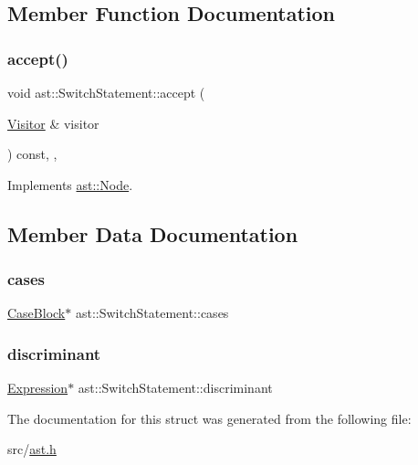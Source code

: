 \subsection{Member Function Documentation}
\mbox{\label{structast_1_1_switch_statement_a1f570a3ec718c95348cedbddcf8e96a1}} 
\subsubsection{\texorpdfstring{accept()}{accept()}}
{\footnotesize\ttfamily void ast\+::\+Switch\+Statement\+::accept (\begin{DoxyParamCaption}\item[{\hyperlink{structast_1_1_visitor}{Visitor} \&}]{visitor }\end{DoxyParamCaption}) const\hspace{0.3cm}{\ttfamily [inline]}, {\ttfamily [override]}, {\ttfamily [virtual]}}



Implements \hyperlink{structast_1_1_node_abc089ee6caaf06a4445ebdd8391fdebc}{ast\+::\+Node}.



\subsection{Member Data Documentation}
\mbox{\label{structast_1_1_switch_statement_ab03ba54ce22b34b83dcd3478ba0a6eb4}} 
\subsubsection{\texorpdfstring{cases}{cases}}
{\footnotesize\ttfamily \hyperlink{structast_1_1_case_block}{Case\+Block}$\ast$ ast\+::\+Switch\+Statement\+::cases}

\mbox{\label{structast_1_1_switch_statement_a145d4ed86b864eda3fd4322edb0a43e7}} 
\subsubsection{\texorpdfstring{discriminant}{discriminant}}
{\footnotesize\ttfamily \hyperlink{structast_1_1_expression}{Expression}$\ast$ ast\+::\+Switch\+Statement\+::discriminant}



The documentation for this struct was generated from the following file\+:\begin{DoxyCompactItemize}
\item 
src/\hyperlink{ast_8h}{ast.\+h}\end{DoxyCompactItemize}
